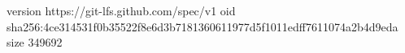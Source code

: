 version https://git-lfs.github.com/spec/v1
oid sha256:4ce314531f0b35522f8e6d3b7181360611977d5f1011edff7611074a2b4d9eda
size 349692
